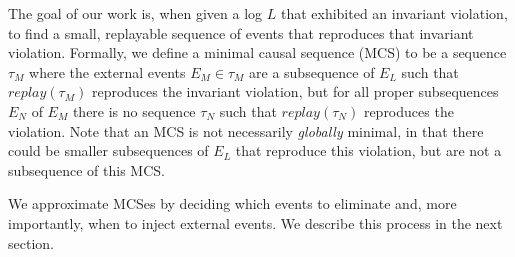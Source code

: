 The goal of our work is, when given a log $L$ that exhibited an
invariant violation, to find a small, replayable sequence of events that reproduces that
invariant violation. Formally, we define a minimal causal sequence (MCS)
to be a sequence $\tau_M$ where the external events $E_M \in \tau_M$ are a
subsequence of $E_L$ such
that $replay(\tau_M)$ reproduces the invariant violation, but for all proper
subsequences $E_N$ of $E_M$
there is no sequence $\tau_N$ such that $replay(\tau_N)$ reproduces the violation.
Note that an MCS is not necessarily {\em globally} minimal, in that there could be smaller
subsequences of $E_L$ that reproduce this violation, but are not a subsequence of this MCS.

We approximate MCSes by deciding
which events to eliminate and, more importantly, when to inject external
events. We describe this process in the next section.
